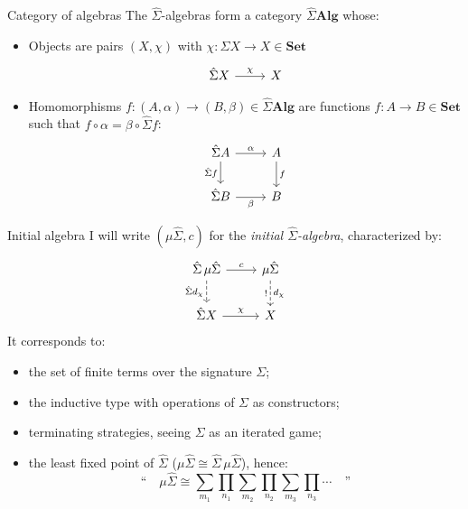 \documentclass{beamer}
\newcommand{\cat}[1]{\mathbf{#1}}
\begin{document}
\begin{frame}[fragile]{Category of algebras} %
The $\hat{\Sigma}$-algebras form a category $\hat{\Sigma} \cat{Alg}$
whose:
\begin{itemize}
  \item Objects are pairs $(X, \chi)$ with
    $\chi : \hat{\Sigma} X \rightarrow X \in \cat{Set}$
    \[
      \begin{tikzcd}
        \hat{\Sigma} X \ar[r, "\chi"] & X
      \end{tikzcd}
    \]
  \item Homomorphisms
    $f : (A, \alpha) \rightarrow (B, \beta) \in \hat{\Sigma} \cat{Alg}$
    are functions $f : A \rightarrow B \in \cat{Set}$ such that
    $f \circ \alpha = \beta \circ \hat{\Sigma} f$:
    \[
      \begin{tikzcd}
        \hat{\Sigma} A \ar[r, "\alpha"] \ar[d, "\hat{\Sigma} f"'] &
        A \ar[d, "f"] \\
        \hat{\Sigma} B \ar[r, "\beta"'] &
        B
      \end{tikzcd}
    \]
\end{itemize}
\end{frame}

\begin{frame}[fragile]{Initial algebra} %
I will write $(\mu \hat{\Sigma}, c)$ for the \emph{initial $\hat{\Sigma}$-algebra},
characterized by:
\[
  \begin{tikzcd}
    \hat{\Sigma} \, \mu\hat{\Sigma} \ar[r, "c"] \ar[d, "\hat{\Sigma} d_\chi"', dashed] &
      \mu \hat{\Sigma} \ar[d, "d_\chi", "!"', dashed] \\
    \hat{\Sigma} X \ar[r, "\chi"] &
      X
  \end{tikzcd}
\]
\pause
It corresponds to:
\begin{itemize}
  \item the set of finite terms over the signature $\Sigma$;
  \item the inductive type with operations of $\Sigma$ as constructors;
  \item terminating strategies, seeing $\Sigma$ as an iterated game;
  \item the least fixed point of $\hat{\Sigma}$
        ($\mu\hat{\Sigma} \cong \hat{\Sigma}\,\mu\hat{\Sigma}$), hence:
    \[
      \text{``} \quad
      \mu \hat{\Sigma} \cong
        \sum_{m_1}
        \prod_{n_1}
        \sum_{m_2}
        \prod_{n_2}
        \sum_{m_3}
        \prod_{n_3}
        \cdots
      \quad \text{''}
    \]
\end{itemize}
\end{frame}
\end{document}
